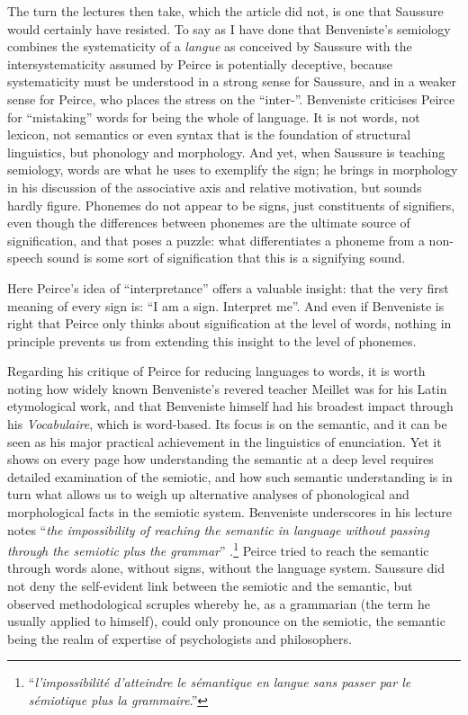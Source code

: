 \documentclass[output=paper]{langscibook}
\begin{document}
The turn the lectures then take, which the article did not, is one that Saussure would certainly have resisted. To say as I have done that Benveniste's semiology combines the systematicity of a \emph{langue} as conceived by Saussure with the intersystematicity assumed by Peirce is potentially deceptive, because systematicity must be understood in a strong sense for Saussure, and in a weaker sense for Peirce, who places the stress on the ``inter-''. Benveniste criticises Peirce for ``mistaking'' words for being the whole of language. It is not words, not lexicon, not semantics or even syntax that is the foundation of structural linguistics, but phonology and morphology. And yet, when Saussure is teaching semiology, words are what he uses to exemplify the sign; he brings in morphology in his discussion of the associative axis and relative motivation, but sounds hardly figure. Phonemes do not appear to be signs, just constituents of signifiers, even though the differences between phonemes are the ultimate source of signification, and that poses a puzzle: what differentiates a phoneme from a non-speech sound is some sort of signification that this is a signifying sound.

Here Peirce's idea of ``interpretance'' offers a valuable insight: that the very first meaning of every sign is: ``I am a sign. Interpret me''. And even if Benveniste is right that Peirce only thinks about signification at the level of words, nothing in principle prevents us from extending this insight to the level of phonemes.

Regarding his critique of Peirce for reducing languages to words, it is worth noting how widely known Benveniste's revered teacher Meillet was for his Latin etymological work, and that Benveniste himself had his broadest impact through his \citeyear{Benveniste1969vocabulaire} \emph{Vocabulaire}, which is word-based. Its focus is on the semantic, and it can be seen as his major practical achievement in the linguistics of enunciation. Yet it shows on every page how understanding the semantic at a deep level requires detailed examination of the semiotic, and how such semantic understanding is in turn what allows us to weigh up alternative analyses of phonological and morphological facts in the semiotic system. Benveniste underscores in his lecture notes ``\emph{the impossibility of reaching the semantic in language without passing through the semiotic plus the grammar}'' \citep[114]{Benveniste1969vocabulaire}.\footnote{``\emph{l'impossibilité d'atteindre le sémantique en langue sans passer par le sémiotique plus la grammaire}.''} Peirce tried to reach the semantic through words alone, without signs, without the language system. Saussure did not deny the self-evident link between the semiotic and the semantic, but observed methodological scruples whereby he, as a grammarian (the term he usually applied to himself), could only pronounce on the semiotic, the semantic being the realm of expertise of psychologists and philosophers.
\end{document}
